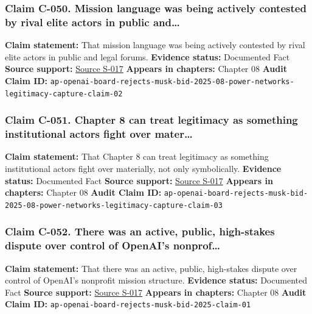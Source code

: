 \documentclass[
  american,
  11pt,
  letterpaper,
]{article}
\begin{document}
\subsubsection{Claim C-050. Mission language was being actively
contested by rival elite actors in public
and\ldots{}}\label{claim-c-050-mission-language-was-being-actively-contested-by-rival-elite-actors-in-public-and}

\textbf{Claim statement:} That mission language was being actively
contested by rival elite actors in public and legal forums.
\textbf{Evidence status:} Documented Fact \textbf{Source support:}
\hyperref[source-s-017-openai-board-unanimously-rejects-elon-musk-s-97-4-billion-proposal]{Source
S-017} \textbf{Appears in chapters:} Chapter 08 \textbf{Audit Claim ID:}
\texttt{ap-openai-board-rejects-musk-bid-2025-08-power-networks-legitimacy-capture-claim-02}

\subsubsection{Claim C-051. Chapter 8 can treat legitimacy as something
institutional actors fight over
mater\ldots{}}\label{claim-c-051-chapter-8-can-treat-legitimacy-as-something-institutional-actors-fight-over-mater}

\textbf{Claim statement:} That Chapter 8 can treat legitimacy as
something institutional actors fight over materially, not only
symbolically. \textbf{Evidence status:} Documented Fact \textbf{Source
support:}
\hyperref[source-s-017-openai-board-unanimously-rejects-elon-musk-s-97-4-billion-proposal]{Source
S-017} \textbf{Appears in chapters:} Chapter 08 \textbf{Audit Claim ID:}
\texttt{ap-openai-board-rejects-musk-bid-2025-08-power-networks-legitimacy-capture-claim-03}

\subsubsection{Claim C-052. There was an active, public, high-stakes
dispute over control of OpenAI's
nonprof\ldots{}}\label{claim-c-052-there-was-an-active-public-high-stakes-dispute-over-control-of-openai-s-nonprof}

\textbf{Claim statement:} That there was an active, public, high-stakes
dispute over control of OpenAI's nonprofit mission structure.
\textbf{Evidence status:} Documented Fact \textbf{Source support:}
\hyperref[source-s-017-openai-board-unanimously-rejects-elon-musk-s-97-4-billion-proposal]{Source
S-017} \textbf{Appears in chapters:} Chapter 08 \textbf{Audit Claim ID:}
\texttt{ap-openai-board-rejects-musk-bid-2025-claim-01}
\end{document}
